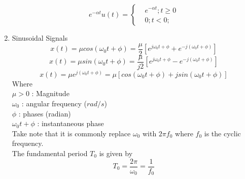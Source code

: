 \begin{enumerate}
\begin{equation}
        e^{-\alpha t}u(t) = 
        \begin{cases}
            & e^{-\alpha t} ; t \geq 0 \\
            & 0 ; t < 0 ;
        \end{cases}
    \end{equation}
    \item Sinusoidal Signals
    \begin{equation}
        x(t) = \mu cos(\omega_0t+\phi) = \frac{\mu}{2}[e^{j\omega_0t+\phi}+e^{-j(\omega_0t+\phi)}]
    \end{equation}
    \begin{equation}
        x(t) = \mu sin(\omega_0t+\phi) = \frac{\mu}{j2}[e^{j\omega_0t+\phi}-e^{-j(\omega_0t+\phi)}]
    \end{equation}
    \begin{equation}
        x(t) = \mu e^{j(\omega_0t+\phi)} = \mu[cos(\omega_0t+\phi) + jsin(\omega_0t+\phi)]
    \end{equation}
    Where \\
    $\mu > 0$ : Magnitude \\
    $\omega_0$ : angular frequency ($rad/s$)\\
    $\phi$ : phases (radian) \\
    $\omega_0t + \phi$ : instantaneous phase \\
    Take note that it is commonly replace $\omega_0$ with $2\pi f_0$ where $f_0$ is the cyclic frequency. \\
    The fundamental period $T_0$ is given by \[T_0 = \frac{2\pi}{\omega_0} = \frac{1}{f_0}\]
\end{enumerate}

